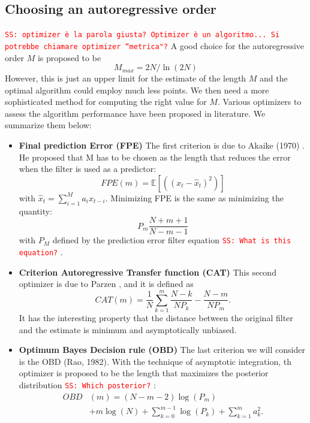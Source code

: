 \documentclass[twocolumn,showpacs,preprintnumbers,nofootinbib,prd,
superscriptaddress,10pt]{revtex4-1}
\newcommand{\sschmidt}[1]{{\textcolor{red}{\texttt{SS: #1}} }}
\begin{document}
\subsection{Choosing an autoregressive order}\label{sec:optimizers} 
\sschmidt{optimizer è la parola giusta? Optimizer è un algoritmo... Si potrebbe chiamare optimizer ``metrica"?}
A good choice for the autoregressive order $M$ is proposed to be \cite{doi:10.1190/1.1440902}
\begin{equation}\label{eq:MMAx}
M_{max} = 2N / \ln{(2N)}
\end{equation}
However, this is just an upper limit for the estimate of the length $M$ and the optimal algorithm could employ much less points.
We then need a more sophisticated method for computing the right value for $M$.
Various optimizers to assess the algorithm performance have been proposed in literature. We summarize them below:

\begin{itemize}
\item \textbf{Final prediction Error (FPE)} 
The first criterion is due to Akaike (1970) \cite{Akaike1970StatisticalPI}. He proposed that M has to be chosen as the length that reduces the error when the filter is used as a predictor: 
\begin{equation}
    FPE(m) = \mathbb{E}\left[ \left((x_t - \hat x_t) ^ 2\right) \right]
\end{equation}
with $\hat{x}_t = \sum_{i = 1}^M a_i x_{t - i}$.
Minimizing FPE is the same as minimizing the quantity: 
\begin{equation}
    P_{m} \frac{N + m + 1}{N - m - 1}
\end{equation}
with $P_M$ defined by the prediction error filter equation \sschmidt{What is this equation?}.
\item \textbf{Criterion Autoregressive Transfer function (CAT)}
This second optimizer is due to Parzen \cite{bhansali1986}, and it is defined as
\begin{equation}
    CAT(m) = \frac{1}{N}\sum_{k = 1}^m \frac{N - k}{N P_k} - \frac{N - m}{N P_m}.
\end{equation}
It has the interesting property that the distance between the original filter and the estimate is minimum and asymptotically unbiased. 

\item \textbf{Optimum Bayes Decision rule (OBD)} 
The last criterion we will consider is the OBD (Rao, 1982)\cite{doi:10.1029/WR018i004p01097}. With the technique of asymptotic integration, th optimizer is proposed to be the length that maximizes the posterior distribution \sschmidt{Which posterior?}: 
   \begin{align}
        OBD&(m) = (N - m - 2) \log(P_m) \nonumber\\
        &+ m \log(N) + \sum_{k = 0}^{m-1} \log(P_k) + \sum_{k = 1}^{m} a_k^2.
    \end{align}
\end{itemize}
\end{document}
